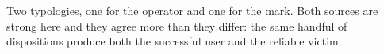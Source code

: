 
\begin{chapterblurb}
Two typologies, one for the operator and one for the mark. Both sources are strong here and they agree more than they differ: the same handful of dispositions produce both the successful user and the reliable victim.
\end{chapterblurb}

